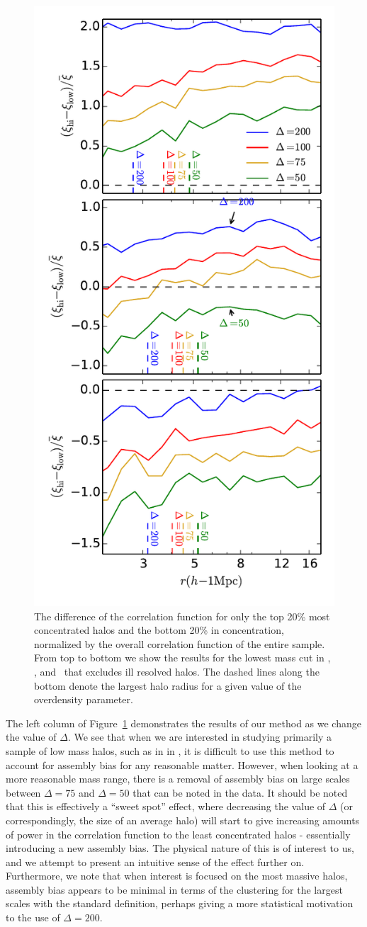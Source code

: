 \documentclass[usenatbib,usegraphicx,letterpaper]{mn2e}
\begin{document}
\begin{figure}
	\centering
	\includegraphics[width=.4\textwidth]{all_cfhilow_z00_cutcomp.pdf}
	\caption{The difference of the correlation function for only the top 20\% most concentrated halos and the bottom 20\% in concentration, normalized by the overall correlation function of the entire sample. From top to bottom we show the results for the lowest mass cut in \simA, \simB, and \simC \ that excludes ill resolved halos. The dashed lines along the bottom denote the largest halo radius for a given value of the overdensity parameter.}
	\label{fig:cc_cfcompare}
\end{figure}


The left column of Figure~\ref{fig:cc_cfcompare} demonstrates the results of our method as we change the value of $\Delta$. We see that when we are interested in studying primarily a sample of low mass halos, such as in in \simA, it is difficult to use this method to account for assembly bias for any reasonable matter. However, when looking at a more reasonable mass range, there is a removal of assembly bias on large scales between $\Delta = 75$ and $\Delta=50$ that can be noted in the data. It should be noted that this is effectively a ``sweet spot'' effect, where decreasing the value of $\Delta$ (or correspondingly, the size of an average halo) will start to give increasing amounts of power in the correlation function to the least concentrated halos - essentially introducing a new assembly bias. The physical nature of this is of interest to us, and we attempt to present an intuitive sense of the effect further on. Furthermore, we note that when interest is focused on the most massive halos, assembly bias appears to be minimal in terms of the clustering for the largest scales with the standard definition, perhaps giving a more statistical motivation to the use of $\Delta = 200$.
\end{document}
